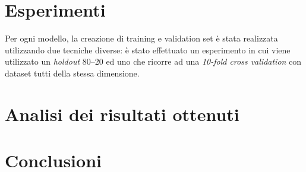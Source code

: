 \chapter{Esperimenti}
Per ogni modello, la creazione di training e validation set è stata realizzata 
utilizzando due tecniche diverse: è stato effettuato un esperimento in cui 
viene utilizzato un \textit{holdout} 80--20 ed uno che ricorre ad una 
\textit{10-fold cross validation} con dataset tutti della stessa dimensione.


\chapter{Analisi dei risultati ottenuti}

\chapter{Conclusioni}
